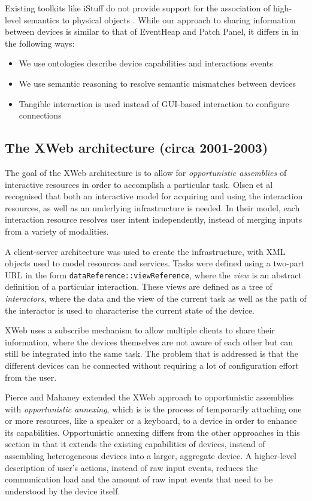 
Existing toolkits like iStuff do not provide support for the association of high-level semantics to physical objects \cite{Shaer2004}. While our approach to sharing information between devices is similar to that of EventHeap and Patch Panel, it differs in in the following ways:

\begin{itemize}
    \item We use ontologies describe device capabilities and interactions events
    \item We use semantic reasoning to resolve semantic mismatches between devices
    \item Tangible interaction is used instead of \ac{GUI}-based interaction to configure connections
\end{itemize}


\subsection{The XWeb architecture (circa 2001-2003)}
The goal of the XWeb architecture is to allow for \emph{opportunistic assemblies} of interactive resources in order to accomplish a particular task. Olsen et al \cite{Olsen2001} recognised that both an interactive model for acquiring and using the interaction resources, as well as an underlying infrastructure is needed. In their model, each interaction resource resolves user intent independently, instead of merging inputs from a variety of modalities.

A client-server architecture was used to create the infrastructure, with \ac{XML} objects used to model resources and services. Tasks were defined using a two-part \ac{URL} in the form \texttt{dataReference::viewReference}, where the \emph{view} is an abstract definition of a particular interaction. These views are defined as a tree of \emph{interactors}, where the data and the view of the current task as well as the path of the interactor is used to characterise the current state of the device.

XWeb uses a subscribe mechanism to allow multiple clients to share their information, where the devices themselves are not aware of each other but can still be integrated into the same task. The problem that is addressed is that the different devices can be connected without requiring a lot of configuration effort from the user.

Pierce and Mahaney \cite{Pierce2003} extended the XWeb approach to opportunistic assemblies with \emph{opportunistic annexing}, which is is the process of temporarily attaching one or more resources, like a speaker or a keyboard, to a device in order to enhance its capabilities. Opportunistic annexing differs from the other approaches in this section in that it extends the existing capabilities of devices, instead of assembling heterogeneous devices into a larger, aggregate device. A higher-level description of user's actions, instead of raw input events, reduces the communication load and the amount of raw input events that need to be understood by the device itself. 



